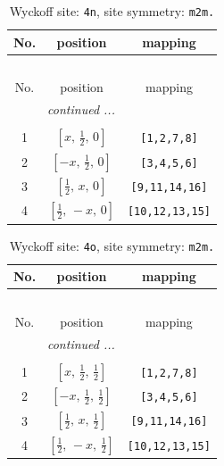 \documentclass[fleqn,8pt]{jsarticle}
\begin{document}
\renewcommand{\arraystretch}{1.2}
\begin{longtable}{ccc}
\caption{Wyckoff site: {\tt 4n}, site symmetry: {\tt m2m.}}
 \\
 \hline \hline
No. & position & mapping \\ \hline \endfirsthead

\multicolumn{2}{l}{\tablename\ \thetable{}} \\
 \hline \hline
No. & position & mapping \\ \hline \endhead

 \hline \hline
\multicolumn{2}{r}{\footnotesize\it continued ...} \\ \endfoot

 \hline \hline
\multicolumn{2}{r}{} \\ \endlastfoot

1 & $\left[ x,\, \frac{1}{2},\, 0 \right]$ & {\tt [1,2,7,8]} \\ \hline
2 & $\left[ - x,\, \frac{1}{2},\, 0 \right]$ & {\tt [3,4,5,6]} \\ \hline
3 & $\left[ \frac{1}{2},\, x,\, 0 \right]$ & {\tt [9,11,14,16]} \\ \hline
4 & $\left[ \frac{1}{2},\, - x,\, 0 \right]$ & {\tt [10,12,13,15]} \\
\end{longtable}
\renewcommand{\arraystretch}{1.2}
\begin{longtable}{ccc}
\caption{Wyckoff site: {\tt 4o}, site symmetry: {\tt m2m.}}
 \\
 \hline \hline
No. & position & mapping \\ \hline \endfirsthead

\multicolumn{2}{l}{\tablename\ \thetable{}} \\
 \hline \hline
No. & position & mapping \\ \hline \endhead

 \hline \hline
\multicolumn{2}{r}{\footnotesize\it continued ...} \\ \endfoot

 \hline \hline
\multicolumn{2}{r}{} \\ \endlastfoot

1 & $\left[ x,\, \frac{1}{2},\, \frac{1}{2} \right]$ & {\tt [1,2,7,8]} \\ \hline
2 & $\left[ - x,\, \frac{1}{2},\, \frac{1}{2} \right]$ & {\tt [3,4,5,6]} \\ \hline
3 & $\left[ \frac{1}{2},\, x,\, \frac{1}{2} \right]$ & {\tt [9,11,14,16]} \\ \hline
4 & $\left[ \frac{1}{2},\, - x,\, \frac{1}{2} \right]$ & {\tt [10,12,13,15]} \\
\end{longtable}
\end{document}
